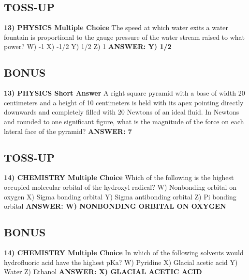 \documentclass{article}
\begin{document}
\subsection*{TOSS-UP}
\textbf{13) PHYSICS Multiple Choice} The speed at which water exits a water fountain is proportional to the gauge pressure of the water stream raised to what power?
\newline
W) -1
\newline
X) -1/2
\newline
Y) 1/2
\newline
Z) 1
\newline
\textbf{ANSWER: Y) 1/2}

\subsection*{BONUS}
\textbf{13) PHYSICS Short Answer} A right square pyramid with a base of width 20 centimeters and a height of 10 centimeters is held with its apex pointing directly downwards and completely filled with 20 Newtons of an ideal fluid. In Newtons and rounded to one significant figure, what is the magnitude of the force on each lateral face of the pyramid?
\newline
\textbf{ANSWER: 7}

\subsection*{TOSS-UP}
\textbf{14) CHEMISTRY Multiple Choice} Which of the following is the highest occupied molecular orbital of the hydroxyl radical?
\newline
W) Nonbonding orbital on oxygen
\newline
X) Sigma bonding orbital
\newline
Y) Sigma antibonding orbital
\newline
Z) Pi bonding orbital
\newline
\textbf{ANSWER: W) NONBONDING ORBITAL ON OXYGEN}

\subsection*{BONUS}
\textbf{14) CHEMISTRY Multiple Choice} In which of the following solvents would hydrofluoric acid have the highest pKa?
\newline
W) Pyridine
\newline
X) Glacial acetic acid
\newline
Y) Water
\newline
Z) Ethanol
\newline
\textbf{ANSWER: X) GLACIAL ACETIC ACID}
\end{document}
